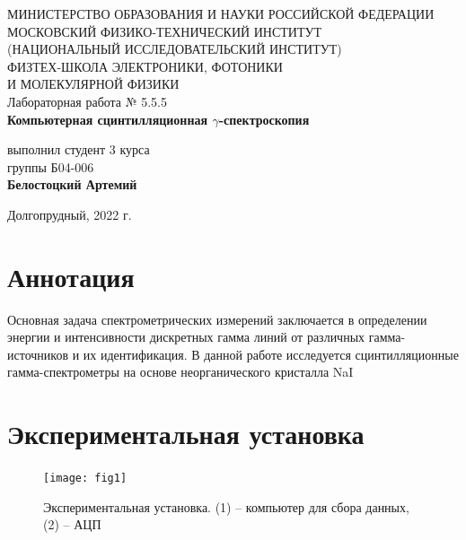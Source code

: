 \documentclass[a4paper,12pt]{article}
\begin{document}
 

\begin{titlepage}
	\begin{center}
		\large 	МИНИСТЕРСТВО ОБРАЗОВАНИЯ И НАУКИ РОССИЙСКОЙ ФЕДЕРАЦИИ\\
				МОСКОВСКИЙ ФИЗИКО-ТЕХНИЧЕСКИЙ ИНСТИТУТ \\
				(НАЦИОНАЛЬНЫЙ ИССЛЕДОВАТЕЛЬСКИЙ ИНСТИТУТ)\\ 
				ФИЗТЕХ-ШКОЛА ЭЛЕКТРОНИКИ, ФОТОНИКИ \\
				И МОЛЕКУЛЯРНОЙ ФИЗИКИ \\
		
		
		\vspace{4.0 cm}
		Лабораторная работа № 5.5.5 \\ 
		\LARGE \textbf{Компьютерная сцинтилляционная $\gamma$-спектроскопия}
	\end{center}
	\vspace{3 cm} \large
	
	\begin{flushright}
		выполнил студент 3 курса \\
		{группы Б04-006}\\
		\textbf{Белостоцкий Артемий}\\
	\end{flushright}
	
	\vfill

	\begin{center}
	Долгопрудный, 2022 г.
	\end{center}
\end{titlepage}                                                                      

\section*{Аннотация}
Основная задача спектрометрических измерений заключается в определении энергии и интенсивности дискретных гамма линий от различных гамма-источников и их идентификация. В данной работе исследуется сцинтилляционные гамма-спектрометры на основе неорганического кристалла NaI

\section*{Экспериментальная установка}

\begin{figure}[h!]
	\centering
	\texttt{[image: fig1]}
	\caption{Экспериментальная установка. (1) -- компьютер для сбора данных, (2) -- АЦП}
	\label{graph1:comp}
\end{figure}
\end{document}
